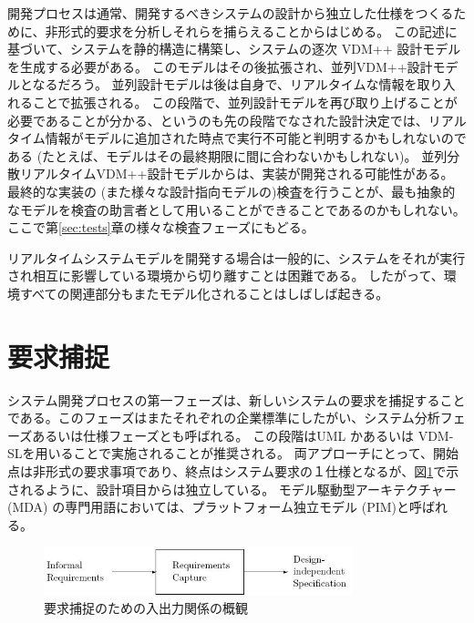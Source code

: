 \documentclass[\pformat,12pt]{jreport}
\begin{document}
開発プロセスは通常、開発するべきシステムの設計から独立した仕様をつくるために、非形式的要求を分析しそれらを捕らえることからはじめる。
この記述に基づいて、システムを静的構造に構築し、システムの逐次 VDM++ 設計モデルを生成する必要がある。
このモデルはその後拡張され、並列VDM++設計モデルとなるだろう。
並列設計モデルは後は自身で、リアルタイムな情報を取り入れることで拡張される。
この段階で、並列設計モデルを再び取り上げることが必要であることが分かる、というのも先の段階でなされた設計決定では、リアルタイム情報がモデルに追加された時点で実行不可能と判明するかもしれないのである (たとえば、モデルはその最終期限に間に合わないかもしれない)。 
並列分散リアルタイムVDM++設計モデルからは、実装が開発される可能性がある。  
最終的な実装の (また様々な設計指向モデルの)検査を行うことが、最も抽象的なモデルを検査の助言者として用いることができることであるのかもしれない。
ここで第\ref{sec:tests}章の様々な検査フェーズにもどる。

リアルタイムシステムモデルを開発する場合は一般的に、システムをそれが実行され相互に影響している環境から切り離すことは困難である。
したがって、環境すべての関連部分もまたモデル化されることはしばしば起きる。

\section{要求捕捉}

システム開発プロセスの第一フェーズは、新しいシステムの要求を捕捉することである。このフェーズはまたそれぞれの企業標準にしたがい、システム分析フェーズあるいは仕様フェーズとも呼ばれる。
この段階はUML かあるいは VDM-SLを用いることで実施されることが推奨される。
両アプローチにとって、開始点は非形式の要求事項であり、終点はシステム要求の１仕様となるが、図\ref{fig:inputoutput}で示されるように、設計項目からは独立している。
モデル駆動型アーキテクチャー(MDA) \cite{MDA} の専門用語においては、プラットフォーム独立モデル (PIM)と呼ばれる。

\begin{figure}
\begin{center}
\includegraphics[width=0.8\textwidth]{reqcapture}
\end{center}
\caption{要求捕捉のための入出力関係の概観}\label{fig:inputoutput}
\end{figure}
\end{document}

